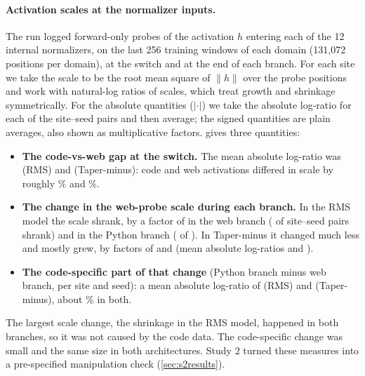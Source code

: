 \documentclass[11pt]{article}
\begin{document}
\paragraph{Activation scales at the normalizer inputs.} The run logged forward-only probes of the activation
$h$ entering each of the 12 internal normalizers, on the last 256 training windows of each domain (131{,}072
positions per domain), at the switch and at the end of each branch. For each site we take the scale to be the
root mean square of $\lVert h\rVert$ over the probe positions and work with natural-log ratios of scales, which
treat growth and shrinkage symmetrically. For the absolute quantities ($|\cdot|$) we take the absolute log-ratio
for each of the \scalePairs{} site--seed pairs and then average; the signed quantities are plain averages, also
shown as multiplicative factors.  gives three quantities:
\begin{itemize}[leftmargin=1.4em,itemsep=2pt]
  \item \textbf{The code-vs-web gap at the switch.} The mean absolute log-ratio was \scaleGapR{} (RMS) and
        \scaleGapT{} (Taper-minus): code and web activations differed in scale by roughly \scaleGapPctR\% and
        \scaleGapPctT\%.
  \item \textbf{The change in the web-probe scale during each branch.} In the RMS model the scale shrank, by a
        factor of \scaleWebFactorR{} in the web branch (\scaleWebShrinkR{} of \scalePairs{} site--seed pairs
        shrank) and \scalePyFactorR{} in the Python branch (\scalePyShrinkR{} of \scalePairs). In Taper-minus it
        changed much less and mostly grew, by factors of \scaleWebFactorT{} and \scalePyFactorT{} (mean absolute
        log-ratios \scaleWebAbsT{} and \scalePyAbsT).
  \item \textbf{The code-specific part of that change} (Python branch minus web branch, per site and seed): a
        mean absolute log-ratio of \scaleSpecificR{} (RMS) and \scaleSpecificT{} (Taper-minus), about
        \scaleSpecificPctR\% in both.
\end{itemize}
The largest scale change, the shrinkage in the RMS model, happened in both branches, so it was not caused by the
code data. The code-specific change was small and the same size in both architectures. Study 2 turned these
measures into a pre-specified manipulation check (\cref{sec:s2results}).

\begin{table}[t]
\centering
\small
\caption{Exploratory: scale of the activations entering the 12 internal normalizers, from the logged diagnostic
probes, as natural-log ratios of per-site scales. Rows marked $|\cdot|$ take the absolute log-ratio for each of
the \scalePairs{} site--seed pairs and then the mean; signed rows are plain means, with the corresponding
multiplicative factor in parentheses.}
\label{tab:scales}

\end{table}
\end{document}
